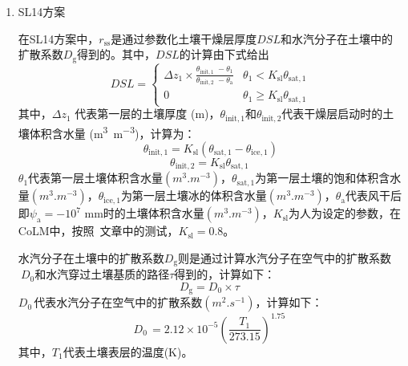\begin{enumerate}
    \def\labelenumi{\arabic{enumi}.}
  \item
    SL14方案

    在SL14方案中，\(r_{\mathrm{ss}}\)是通过参数化土壤干燥层厚度\(DSL\)和水汽分子在土壤中的扩散系数\(D_{\mathrm{g}}\)得到的。其中，\(DSL\)的计算由下式给出
    \begin{equation}
      DSL = \begin{cases}
        \Delta z_{1} \times \frac{\theta_{\mathrm{init,1\ \ }} - \theta_{1}}{\theta_{\mathrm{init,2\ \ }} - \theta_{\mathrm{a}}} & \theta_{1} < K_{\mathrm{sl}}\theta_{\mathrm{sat,1}} \\
        0   & \theta_{1} \geqslant K_{\mathrm{sl}}\theta_{\mathrm{sat,1}}
      \end{cases}
    \end{equation}
    其中，$\Delta z_{1}$ 代表第一层的土壤厚度 (\unit{m})，\(\theta_{\mathrm{init,1}}\)和\(\theta_{\mathrm{init,2}}\)代表干燥层启动时的土壤体积含水量 (\unit{m^{3}.m^{-3}})，计算为：
    \begin{equation}
      \theta_{\mathrm{init,1}} = K_{\mathrm{sl}}\left(\theta_{\mathrm{sat,1}} - \theta_{\mathrm{ice,1}} \right)
    \end{equation}
    \begin{equation}
      \theta_{\mathrm{init,2}} = K_{\mathrm{sl}}\theta_{\mathrm{sat,1}}\
    \end{equation}
    \(\theta_{1}\)代表第一层土壤体积含水量\((\unit{m^{3}.m^{-3}})\)，\(\theta_{\mathrm{sat,1}}\)为第一层土壤的饱和体积含水量\((\unit{m^{3}.m^{-3}})\)，\(\theta_{\mathrm{ice,1}}\)为第一层土壤冰的体积含水量\((\unit{m^{3}.m^{-3}})\)，\(\theta_{\mathrm{a}}\)代表风干后即\(\psi_{\mathrm{a}} = - 10^{7}\) mm时的土壤体积含水量\((\unit{m^{3}.m^{-3}})\)，\(K_{\mathrm{sl}}\)为人为设定的参数，在CoLM中，按照~\citet{sl2014}文章中的测试，$K_{\mathrm{sl}}=0.8$。

    水汽分子在土壤中的扩散系数\(D_{\mathrm{g}}\)则是通过计算水汽分子在空气中的扩散系数\(\ D_{0}\)和水汽穿过土壤基质的路径\(\tau\)得到的，计算如下：
    \begin{equation}
      D_{\mathrm{g}} = D_{0} \times \tau\
    \end{equation}
    \(D_{0\ }\)代表水汽分子在空气中的扩散系数\((\unit{m^{2}.s^{- 1}})\)，计算如下：
    \begin{equation}
      D_{0\ } = 2.12 \times 10^{- 5}\left( \frac{T_{1}}{273.15} \right)^{1.75}\
    \end{equation}
    其中，\(T_{1}\)代表土壤表层的温度(K)。


\end{enumerate}
